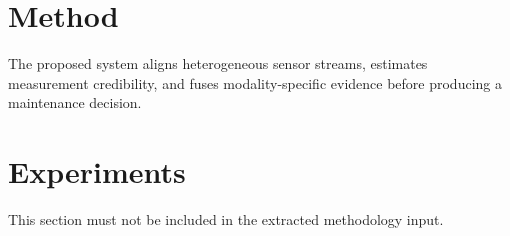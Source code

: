 \section{Method}
The proposed system aligns heterogeneous sensor streams, estimates measurement credibility,
and fuses modality-specific evidence before producing a maintenance decision.

\section{Experiments}
This section must not be included in the extracted methodology input.
